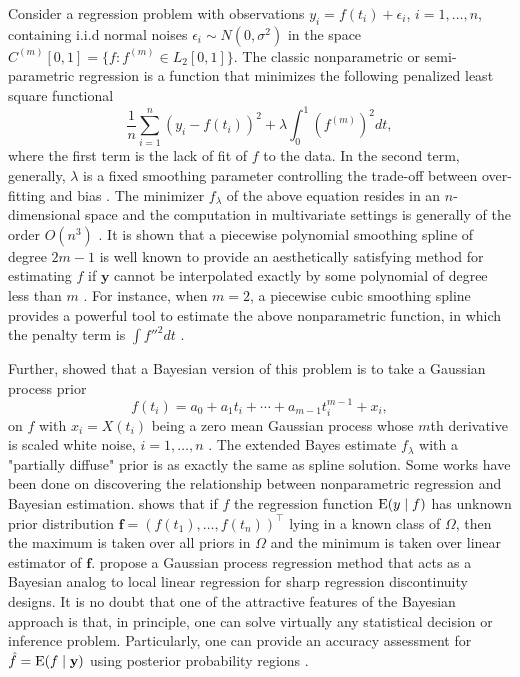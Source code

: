 Consider a regression problem with observations $y_i = f(t_i)+\epsilon_i$, $i=1,\ldots,n$, containing i.i.d normal noises $\epsilon_i\sim N(0,\sigma^2)$ in the space $C^{(m)}[0,1]=\{ f:f^{(m)}\in \mathit{L}_2[0,1] \}$. The classic nonparametric or semi-parametric regression is a function that minimizes the following penalized least square functional 
\begin{equation}\label{GaussianProcessGeneralObjective}
\frac{1}{n}\sum_{i=1}^{n}\left( y_i-f(t_i) \right)^2 + \lambda \int_{0}^{1} \left( f^{(m)}\right)^2dt, 
\end{equation}
where the first term is the lack of fit of $f$ to the data. In the second term, generally, $\lambda$ is a fixed smoothing parameter controlling the trade-off between over-fitting and bias \cite{esl2009}. The minimizer $f_\lambda$ of the above equation resides in an $n$-dimensional space and the computation in multivariate settings is generally of the order $O(n^3)$ \cite{kim2004smoothing}. It is shown that a piecewise polynomial smoothing spline of degree $2m-1$ is well known to provide an aesthetically satisfying method for estimating $f$ if $\mathbf{y}$ cannot be interpolated exactly by some polynomial of degree less than $m$ \cite{schoenberg1964spline}. For instance, when $m=2$, a piecewise cubic smoothing spline provides a powerful tool to estimate the above nonparametric function, in which the penalty term is $\int f''^2dt$ \cite{hastie1990generalized}. 



Further, \cite{wahba1978improper} showed that a Bayesian version of this problem is to take a Gaussian process prior 
\begin{equation*}
f(t_i) = a_0+a_1t_i+\cdots + a_{m-1}t_i^{m-1} + x_i,
\end{equation*}
on $f$ with $x_i=X(t_i)$ being a zero mean Gaussian process whose $m$th derivative is scaled white noise, $i=1,\ldots,n$ \cite{speckman2003fully}. The extended Bayes estimate $f_\lambda$ with a "partially diffuse" prior is as exactly the same as spline solution. Some works have been done on discovering the relationship between nonparametric regression and Bayesian estimation. \cite{heckman1991minimax} shows that if $f$ the regression function $\mathrm{E}(y\mid f)$ has unknown prior distribution  $\mathbf{f}=(f(t_1),\ldots,f(t_n))^\top$ lying in a known class of $\Omega$, then the maximum is taken over all priors in $\Omega$ and the minimum is taken over linear estimator of $\mathbf{f}$. \cite{branson2017nonparametric} propose a Gaussian process regression method that acts as a Bayesian analog to local linear regression for sharp regression discontinuity designs. It is no doubt that one of the attractive features of the Bayesian approach is that, in principle, one can solve virtually any statistical decision or inference problem. Particularly, one can provide an accuracy assessment for $\hat{f}=\mathrm{E} (f\mid \mathbf{y})$ using posterior probability regions \cite{cox1993analysis}. 


